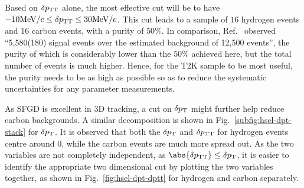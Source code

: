      Based on $\delta p_\textrm{TT}$ alone, the most effective cut will be to have $-10\textrm{MeV}/c \leq \delta p_\textrm{TT} \leq 30\textrm{MeV}/c$.
     This cut leads to a sample of $16$ hydrogen events and $16$ carbon events, with a purity of $50\%$.
     In comparison, Ref.~\cite{MINERvA:2023avz} observed ``5,580(180) signal events over the estimated background of 12,500 events'', the purity of which is considerably lower than the $50\%$ achieved here, but the total number of events is much higher.
     Hence, for the T2K sample to be most useful, the purity needs to be as high as possible so as to reduce the systematic uncertainties for any parameter measurements.

     As SFGD is excellent in 3D tracking, a cut on $\delta p_\textrm{T}$ might further help reduce carbon backgrounds.
     A similar decomposition is shown in Fig.~\ref{subfig:hsel-dpt-stack} for $\delta p_\textrm{T}$.
     It is observed that both the $\delta p_\textrm{T}$ and $\delta p_\textrm{TT}$ for hydrogen events centre around $0$, while the carbon events are much more spread out.
     As the two variables are not completely independent, as $\abs{\dptt} \leq \dpt$, it is easier to identify the appropriate two dimensional cut by plotting the two variables together, as shown in Fig.~\ref{fig:hsel-dpt-dptt} for hydrogen and carbon separately.
